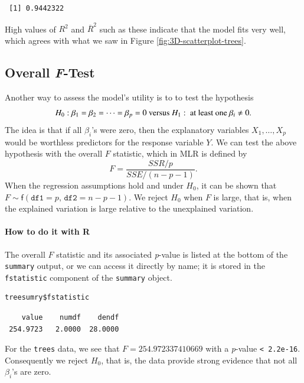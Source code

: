 \documentclass[captions=tableheading]{scrbook}
\begin{document}
\begin{verbatim}
 [1] 0.9442322
\end{verbatim}

High values of \(R^{2}\) and \( \overline{R}^2 \) such as these indicate that the model fits very well, which agrees with what we saw in Figure \ref{fig:3D-scatterplot-trees}.
\subsection{Overall \emph{F}-Test}
\label{sec-7-3-2}

\label{sub:mlr-Overall-F-Test}

Another way to assess the model's utility is to to test the hypothesis
\[
H_{0}:\beta_{1}=\beta_{2}=\cdots=\beta_{p}=0\mbox{ versus }H_{1}:\mbox{ at least one \ensuremath{\beta_{i}\neq0}}.
\]
The idea is that if all \(\beta_{i}\)'s were zero, then the explanatory variables \(X_{1},\ldots,X_{p}\) would be worthless predictors for the response variable \(Y\). We can test the above hypothesis with the overall \(F\) statistic, which in MLR is defined by
\begin{equation}
F=\frac{SSR/p}{SSE/(n-p-1)}.
\end{equation}
When the regression assumptions hold and under \(H_{0}\), it can be shown that \(F\sim\mathsf{f}(\mathtt{df1}=p,\,\mathtt{df2}=n-p-1)\). We reject \(H_{0}\) when \(F\) is large, that is, when the explained variation is large relative to the unexplained variation.

\paragraph*{How to do it with \textsf{R}}

The overall \(F\) statistic and its associated \emph{p}-value is listed at the bottom of the \texttt{summary} output, or we can access it directly by name; it is stored in the \texttt{fstatistic} component of the \texttt{summary} object. 


\begin{verbatim}
treesumry$fstatistic
\end{verbatim}

\begin{verbatim}
    value    numdf    dendf 
 254.9723   2.0000  28.0000
\end{verbatim}

For the \texttt{trees} data, we see that \( F =  254.972337410669 \) with a \emph{p}-value \texttt{< 2.2e-16}. Consequently we reject \(H_{0}\), that is, the data provide strong evidence that not all \(\beta_{i}\)'s are zero.
\end{document}
